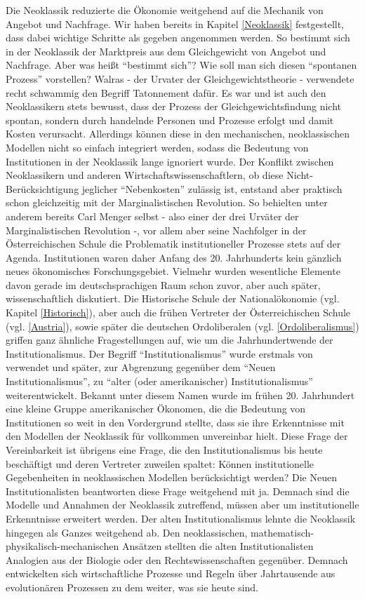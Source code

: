 Die Neoklassik reduzierte die Ökonomie weitgehend auf die Mechanik von Angebot und Nachfrage. Wir haben bereits in Kapitel \ref{Neoklassik} festgestellt, dass dabei wichtige Schritte als gegeben angenommen werden. So bestimmt sich in der Neoklassik der Marktpreis aus dem Gleichgewicht von Angebot und Nachfrage. Aber was heißt "`bestimmt sich"'? Wie soll man sich diesen "`spontanen Prozess"' vorstellen? Walras - der Urvater der Gleichgewichtstheorie - verwendete recht schwammig den Begriff Tatonnement dafür. Es war und ist auch den Neoklassikern stets bewusst, dass der Prozess der Gleichgewichtsfindung nicht spontan, sondern durch handelnde Personen und Prozesse erfolgt und damit Kosten verursacht. Allerdings können diese in den mechanischen, neoklassischen Modellen nicht so einfach integriert werden, sodass die Bedeutung von Institutionen in der Neoklassik lange ignoriert wurde. Der Konflikt zwischen Neoklassikern und anderen Wirtschaftswissenschaftlern, ob diese Nicht-Berücksichtigung jeglicher "`Nebenkosten"' zulässig ist, entstand aber praktisch schon gleichzeitig mit der Marginalistischen Revolution. So behielten unter anderem bereits Carl Menger selbst - also einer der drei Urväter der Marginalistischen Revolution -, vor allem aber seine Nachfolger in der Österreichischen Schule die Problematik institutioneller Prozesse stets auf der Agenda. Institutionen waren daher Anfang des 20. Jahrhunderts kein gänzlich neues ökonomisches Forschungsgebiet. Vielmehr wurden wesentliche Elemente davon gerade im deutschsprachigen Raum schon zuvor, aber auch später, wissenschaftlich diskutiert. Die Historische Schule der Nationalökonomie (vgl. Kapitel \ref{Historisch}), aber auch die frühen Vertreter der Österreichischen Schule (vgl. \ref{Austria}), sowie später die deutschen Ordoliberalen (vgl. \ref{Ordoliberalismus}) griffen ganz ähnliche Fragestellungen auf, wie um die Jahrhundertwende der Institutionalismus. Der Begriff "`Institutionalismus"' wurde erstmals von \textcite{Hamilton1919} verwendet und später, zur Abgrenzung gegenüber dem "`Neuen Institutionalismus"', zu "`alter (oder amerikanischer) Institutionalismus"' weiterentwickelt. Bekannt unter diesem Namen wurde im frühen 20. Jahrhundert eine kleine Gruppe amerikanischer Ökonomen, die die Bedeutung von Institutionen so weit in den Vordergrund stellte, dass sie ihre Erkenntnisse mit den Modellen der Neoklassik für vollkommen unvereinbar hielt. Diese Frage der Vereinbarkeit ist übrigens eine Frage, die den Institutionalismus bis heute beschäftigt und deren Vertreter zuweilen spaltet: Können institutionelle Gegebenheiten in neoklassischen Modellen berücksichtigt werden? Die Neuen Institutionalisten beantworten diese Frage weitgehend mit ja. Demnach sind die Modelle und Annahmen der Neoklassik zutreffend, müssen aber um institutionelle Erkenntnisse erweitert werden. Der alten Institutionalismus lehnte die Neoklassik hingegen als Ganzes weitgehend ab. Den neoklassischen, mathematisch-physikalisch-mechanischen Ansätzen stellten die alten Institutionalisten Analogien aus der Biologie oder den Rechtswissenschaften gegenüber. Demnach entwickelten sich wirtschaftliche Prozesse und Regeln über Jahrtausende aus evolutionären Prozessen zu dem weiter, was sie heute sind. 

